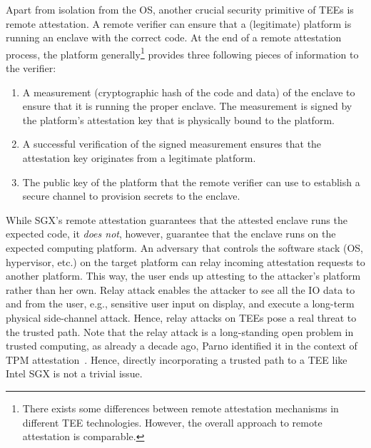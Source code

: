 Apart from isolation from the OS, another crucial security primitive of TEEs is remote attestation. A remote verifier can ensure that a (legitimate) platform is running an enclave with the correct code. At the end of a remote attestation process, the platform generally\footnote{There exists some differences between remote attestation mechanisms in different TEE technologies. However, the overall approach to remote attestation is comparable.} provides three following pieces of information to the verifier: 
\begin {enumerate}
\item A measurement (cryptographic hash of the code and data) of the enclave to ensure that it is running the proper enclave. The measurement is signed by the platform's attestation key that is physically bound to the platform. 
\item A successful verification of the signed measurement ensures that the attestation key originates from a legitimate platform.
\item The public key of the platform that the remote verifier can use to establish a secure channel to provision secrets to the enclave.
\end{enumerate}
While SGX's remote attestation guarantees that the attested enclave runs the expected code, it \emph{does not}, however, guarantee that the enclave runs on the expected computing platform. An adversary that controls the software stack (OS, hypervisor, etc.) on the target platform can relay incoming attestation requests to another platform. This way, the user ends up attesting to the attacker's platform rather than her own. Relay attack enables the attacker to see all the IO data to and from the user, e.g., sensitive user input on display, and execute a long-term physical side-channel attack. Hence, relay attacks on TEEs pose a real threat to the trusted path. Note that the relay attack is a long-standing open problem in trusted computing, as already a decade ago, Parno identified it in the context of TPM attestation~\cite{parno2008bootstrapping}. Hence, directly incorporating a trusted path to a TEE like Intel SGX is not a trivial issue.


